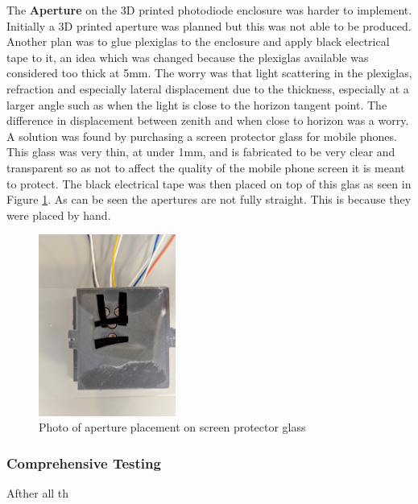 \noindent The {\bfseries Aperture} on the 3D printed photodiode enclosure was harder to implement. Initially a 3D printed aperture was planned but this was not able to be produced. Another plan was to glue plexiglas to the enclosure and apply black electrical tape to it, an idea which was changed because the plexiglas available was considered too thick at 5mm. The worry was that light scattering in the plexiglas, refraction and especially lateral displacement due to the thickness,  especially at a larger angle such as when the light is close to the horizon tangent point. The difference in displacement between zenith and when close to horizon was a worry. A solution was found by purchasing a screen protector glass for mobile phones. This glass was very thin, at under 1mm, and is fabricated to be very clear and transparent so as not to affect the quality of the mobile phone screen it is meant to protect.
The black electrical tape was then placed on top of this glas as seen in Figure \ref{fig:aperturePhoto}. As can be seen the apertures are not fully straight. This is because they were placed by hand. 
%
\begin{figure}[htbp] %
  \centering
  \includegraphics[width=0.4\textwidth]{chapters/methodology/prototype/aperture_photo.jpg}
  \caption{Photo of aperture placement on screen protector glass}
  \label{fig:aperturePhoto}
\end{figure}
\vspace{1em}



\subsubsection*{Comprehensive Testing}

Afther all th





